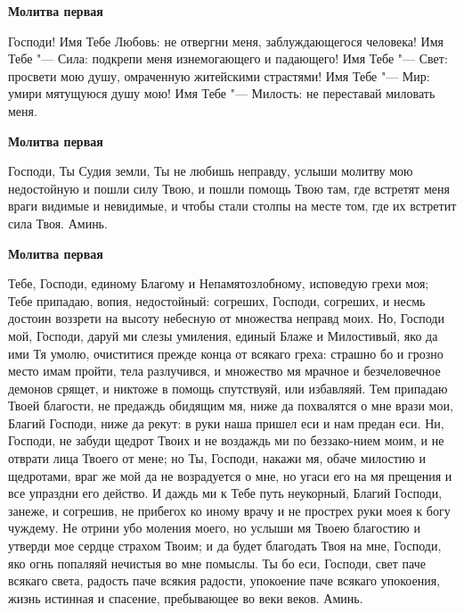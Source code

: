  


\bfseries Молитва первая\normalfont{}\nopagebreak


Господи! Имя Тебе Любовь: не отвергни меня, заблуждающегося человека! Имя Тебе "--- Сила: подкрепи меня изнемогающего и падающего! Имя Тебе "--- Свет: просвети мою душу, омраченную житейскими страстями! Имя Тебе "--- Мир: умири мятущуюся душу мою! Имя Тебе "--- Милость: не переставай миловать меня.


\bfseries Молитва первая\normalfont{}\nopagebreak


Господи, Ты Судия земли, Ты не любишь неправду, услыши молитву мою недостойную и пошли силу Твою, и пошли помощь Твою там, где встретят меня враги видимые и невидимые, и чтобы стали столпы на месте том, где их встретит сила Твоя. Аминь.


\bfseries Молитва первая\normalfont{}\nopagebreak


Тебе, Господи, единому Благому и Непамятозлобному, исповедую грехи моя; Тебе припадаю, вопия, недостойный: согреших, Господи, согреших, и несмь достоин воззрети на высоту небесную от множества неправд моих. Но, Господи мой, Господи, даруй ми слезы умиления, единый Блаже и Милостивый, яко да ими Тя умолю, очиститися прежде конца от всякаго греха: страшно бо и грозно место имам пройти, тела разлучився, и множество мя мрачное и безчеловечное демонов срящет, и никтоже в помощь спутствуяй, или избавляяй. Тем припадаю Твоей благости, не предаждь обидящим мя, ниже да похвалятся о мне врази мои, Благий Господи, ниже да рекут: в руки наша пришел еси и нам предан еси. Ни, Господи, не забуди щедрот Твоих и не воздаждь ми по беззако-нием моим, и не отврати лица Твоего от мене; но Ты, Господи, накажи мя, обаче милостию и щедротами, враг же мой да не возрадуется о мне, но угаси его на мя прещения и все упраздни его действо. И даждь ми к Тебе путь неукорный, Благий Господи, занеже, и согрешив, не прибегох ко иному врачу и не прострех руки моея к богу чуждему. Не отрини убо моления моего, но услыши мя Твоею благостию и утверди мое сердце страхом Твоим; и да будет благодать Твоя на мне, Господи, яко огнь попаляяй нечистыя во мне помыслы. Ты бо еси, Господи, свет паче всякаго света, радость паче всякия радости, упокоение паче всякаго упокоения, жизнь истинная и спасение, пребывающее во веки веков. Аминь.
\longpage{}\nopagebreak\mychapterending

